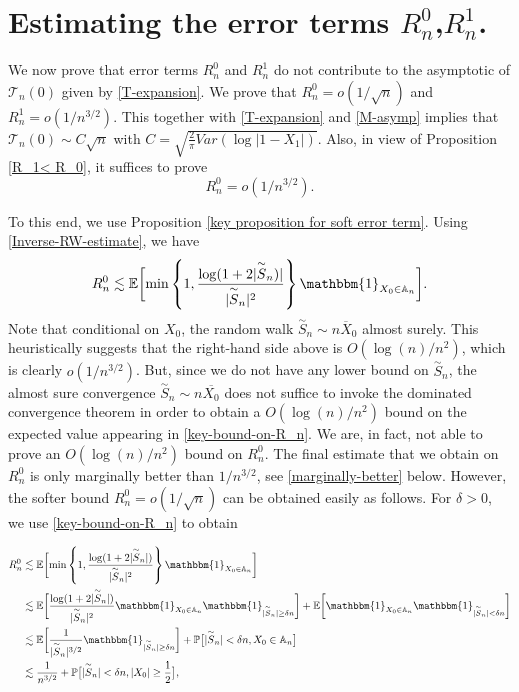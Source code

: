 \documentclass[9pt,a4paper,reqno]{amsart}
\newcommand{\tildea}[1]{\overset{\sim}{#1}}
\theoremstyle{mine}
\theoremstyle{definition}
\theoremstyle{remark}
\newcommand{\mb}{\mathbb}
\begin{document}
\section{Estimating the error terms \texorpdfstring{$R_n^0$,$R_n^1$}{Rn0, Rn1}.} \label{last-analysis-of-remainder}
We now prove that error terms $R_n^0$ and $R_n^1$ do not contribute to the asymptotic of $\mathcal{T}_n(0)$ given by \eqref{T-expansion}.
We prove that $R_n^0 = o(1/\sqrt{n})$ and $R_n^1 = o(1/n^{3/2})$. 
This together with \eqref{T-expansion} and \eqref{M-asymp} implies that $\mathcal{T}_n(0) \sim C\sqrt{n}$ with $C = \sqrt{\frac{2}{\pi} Var(\log|1-X_1|)}$. Also, in view of Proposition \ref{R_1< R_0}, it suffices to prove 
\begin{equation}\label{strong-claim}
    R_n^0 = o(1/n^{3/2}).
\end{equation}

To this end, we use Proposition \ref{key proposition for soft error term}. Using \eqref{Inverse-RW-estimate}, we have  
\begin{align} \label{key-bound-on-R_n}
        R_n^0 \lesssim  \mb{E}\biggl[\min \left \{ 1, \frac{\log(1+2|\tildea{S}_n)|}{|\tildea{S}_n|^2}  \right \}\mathbbm{1}_{X_0 \in \mb{A}_n}\biggr].
    \end{align}
Note that conditional on $X_0$, the random walk $\tildea{S}_n \sim n \overline{X}_0$ almost surely. This heuristically suggests that the right-hand side above is $O(\log(n)/n^2)$, which is clearly $o(1/n^{3/2})$. But, since we do not have any lower bound on $\tildea{S}_n$, the almost sure convergence $\tildea{S}_n \sim n \overline{X_0}$ does not suffice to invoke the dominated convergence theorem in order to obtain a $O(\log(n)/n^2)$ bound on the expected value appearing in \eqref{key-bound-on-R_n}. We are, in fact, not able to prove an $O(\log(n)/n^2)$ bound on $R_n^0$. The final estimate that we obtain on $R_n^0$ is only marginally better than $1/n^{3/2}$, see \eqref{marginally-better} below. However, the softer bound $R_n^0 = o(1/\sqrt{n})$ can be obtained easily as follows. For $\delta > 0 $, we use \eqref{key-bound-on-R_n} to obtain 

\begin{align} \label{key-bound-on-R_n-second}
        R_n^0 &\lesssim \mb{E}\biggl[\min \left \{ 1, \frac{\log(1+2|\tildea{S}_n|)}{|\tildea{S}_n|^2}  \right \}\mathbbm{1}_{X_0 \in \mb{A}_n}\biggr] \\ 
        &\lesssim \mb{E}\biggl[ \frac{\log(1+2|\tildea{S}_n|)}{|\tildea{S}_n|^2}  \mathbbm{1}_{X_0 \in \mb{A}_n} \mathbbm{1}_{|\tildea{S}_n| \geq  \delta n}\biggr] + \mb{E}\biggl[ \mathbbm{1}_{X_0 \in \mb{A}_n}\mathbbm{1}_{|\tildea{S}_n| < \delta n}\biggr]\nonumber\\
        & \lesssim \mb{E}\biggl[ \frac{1}{|\tildea{S}_n|^{3/2}}   \mathbbm{1}_{|\tildea{S}_n| \geq  \delta n}\biggr] + \mb{P}\bigl[ |\tildea{S}_n| < \delta n, X_0 \in \mb{A}_n\bigr]\nonumber\\ 
        &\lesssim \frac{1}{n^{3/2}} + \mb{P}\bigl[ |\tildea{S}_n| < \delta n, |X_0|  \geq \frac{1}{2}\bigr], \nonumber
    \end{align}
    
\end{document}
